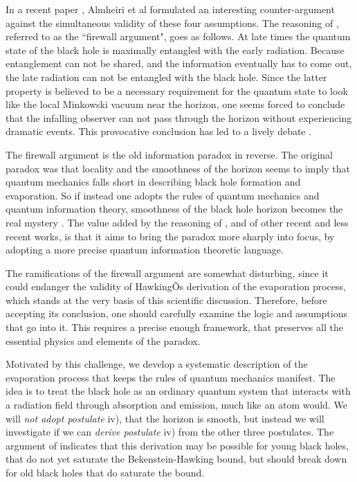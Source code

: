 \documentclass[12pt]{article}%
\begin{document}
In a recent paper \cite{amps}, Almheiri et al formulated an interesting counter-argument against the simultaneous validity of these four assumptions. 
The reasoning of \cite{amps}, referred to as the ``firewall argument",  goes as follows. At late times the quantum state of the black hole is maximally entangled with the early radiation. Because entanglement can not be shared, and the information eventually has to come out, the late radiation can not be entangled with the black hole. Since the latter property is believed to be a necessary requirement for the quantum state to look like the local Minkowski vacuum near the horizon, one seems forced to conclude that the infalling observer can not pass through the horizon without experiencing dramatic events. This provocative conclusion has led to a lively debate \cite{followup}\cite{susskind-entanglement}.



The firewall argument is the old information paradox in reverse. The original paradox was that 
locality and the smoothness of the horizon seems to imply that quantum mechanics falls short in describing black hole formation and evaporation.
So if instead one adopts the rules of quantum mechanics and quantum information theory, smoothness of the black hole horizon becomes the real mystery \cite{mathur-info-paradox}.
The value added by the reasoning of \cite{amps}, and of other recent  \cite{haydenpreskill, fastscrambler, avery, giddings-qu-info} and less recent  \cite{page-subsystem, page-bh-info} works, is that it aims to bring the paradox more sharply into focus, by adopting a
more precise  quantum information theoretic language. 

The ramifications of the firewall argument are somewhat disturbing, since it could endanger the validity of HawkingÕs derivation of the evaporation process,
which stands at the very basis of this scientific discussion. Therefore, before accepting its conclusion, one should carefully
 examine the logic and assumptions that go into it. This requires a precise enough framework, that preserves all the essential physics and elements of the paradox.

Motivated by this challenge, we develop a systematic description of the evaporation process that
keeps the rules of quantum mechanics manifest.
The idea is to treat the black hole as an ordinary quantum system that interacts with a radiation field through 
absorption and emission, much like an atom would. We  will {\it not adopt postulate} iv), that the horizon is smooth, but instead we will investigate
if we can {\it derive postulate} iv) from the other three postulates. The argument of \cite{amps} indicates that this derivation
may be possible for young black holes, that do not yet saturate the Bekenstein-Hawking bound, but should break down for old black holes that do saturate the bound.
\end{document}
